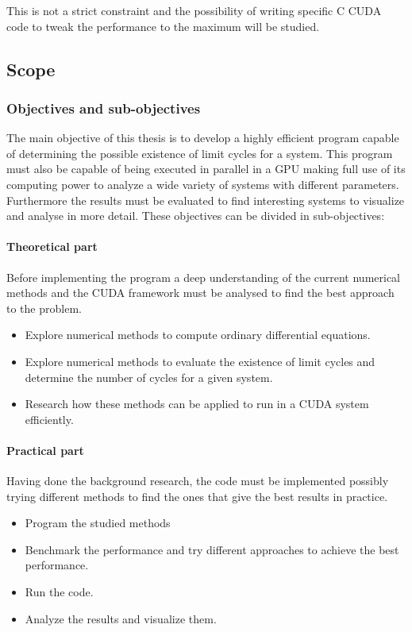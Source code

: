 This is not a strict constraint and the possibility of writing specific C CUDA
code to tweak the performance to the maximum will be studied.



\subsection{Scope}
\subsubsection{Objectives and sub-objectives}

The main objective of this thesis is to develop a highly efficient program
capable of determining the possible existence of limit cycles for a system. This
program must also be capable of being executed in parallel in a GPU making full
use of its computing power to analyze a wide variety of systems with different
parameters. Furthermore the results must be evaluated to find interesting
systems to visualize and analyse in more detail. These objectives can be divided
in sub-objectives:

\paragraph{Theoretical part} Before implementing the program a deep
understanding of the current numerical methods and the CUDA framework must be
analysed to find the best approach to the problem.

\begin{itemize}
    \item Explore numerical methods to compute ordinary differential equations.
    \item Explore numerical methods to evaluate the existence of limit cycles
        and determine the number of cycles for a given system.
    \item Research how these methods can be applied to run in a CUDA system
        efficiently.
\end{itemize}

\paragraph{Practical part} Having done the background research, the code must be
implemented possibly trying different methods to find the ones that give the
best results in practice.

\begin{itemize}
    \item Program the studied methods
    \item Benchmark the performance and try different approaches to achieve the
        best performance.
    \item Run the code.
    \item Analyze the results and visualize them.
\end{itemize}

